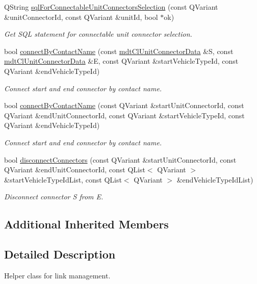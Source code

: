 \begin{DoxyCompactItemize}
Q\-String \hyperlink{classmdt_cl_link_a17eb46d4b5b94b3d48956a05ae7d0a67}{sql\-For\-Connectable\-Unit\-Connectors\-Selection} (const Q\-Variant \&unit\-Connector\-Id, const Q\-Variant \&unit\-Id, bool $\ast$ok)
\begin{DoxyCompactList}\small\item\em Get S\-Q\-L statement for connectable unit connector selection. \end{DoxyCompactList}\item 
bool \hyperlink{classmdt_cl_link_a335a8475470ede4a5d9b8e01404d7230}{connect\-By\-Contact\-Name} (const \hyperlink{classmdt_cl_unit_connector_data}{mdt\-Cl\-Unit\-Connector\-Data} \&S, const \hyperlink{classmdt_cl_unit_connector_data}{mdt\-Cl\-Unit\-Connector\-Data} \&E, const Q\-Variant \&start\-Vehicle\-Type\-Id, const Q\-Variant \&end\-Vehicle\-Type\-Id)
\begin{DoxyCompactList}\small\item\em Connect start and end connector by contact name. \end{DoxyCompactList}\item 
bool \hyperlink{classmdt_cl_link_a429e8f4e2b46e3fd995db47ce430c6c4}{connect\-By\-Contact\-Name} (const Q\-Variant \&start\-Unit\-Connector\-Id, const Q\-Variant \&end\-Unit\-Connector\-Id, const Q\-Variant \&start\-Vehicle\-Type\-Id, const Q\-Variant \&end\-Vehicle\-Type\-Id)
\begin{DoxyCompactList}\small\item\em Connect start and end connector by contact name. \end{DoxyCompactList}\item 
bool \hyperlink{classmdt_cl_link_ac32bfef9f23b431ea4d3d546e6c21361}{disconnect\-Connectors} (const Q\-Variant \&start\-Unit\-Connector\-Id, const Q\-Variant \&end\-Unit\-Connector\-Id, const Q\-List$<$ Q\-Variant $>$ \&start\-Vehicle\-Type\-Id\-List, const Q\-List$<$ Q\-Variant $>$ \&end\-Vehicle\-Type\-Id\-List)
\begin{DoxyCompactList}\small\item\em Disconnect connector S from E. \end{DoxyCompactList}\end{DoxyCompactItemize}
\subsection*{Additional Inherited Members}


\subsection{Detailed Description}
Helper class for link management. 

